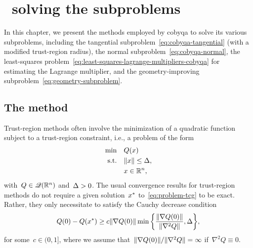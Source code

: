 %
%
%
\chapter{ \textemdash\ solving the subproblems}
\label{ch:cobyqa-subproblems}

In this chapter, we present the methods employed by \gls{cobyqa} to solve its various subproblems, including the tangential subproblem~\cref{eq:cobyqa-tangential} (with a modified trust-region radius), the normal subproblem~\cref{eq:cobyqa-normal}, the least-squares problem~\cref{eq:least-squares-lagrange-multipliers-cobyqa} for estimating the Lagrange multiplier, and the geometry-improving subproblem~\cref{eq:geometry-subproblem}.

\section{The  method}

Trust-region methods often involve the minimization of a quadratic function subject to a trust-region constraint, i.e., a problem of the form
\begin{subequations}
    \label{eq:problem-tcg}
    \begin{align}
        \min        & \quad Q(\iter)\\
        \text{s.t.} & \quad \norm{\iter} \le \rad,\\
                    & \quad \iter \in \R^n, \nonumber
    \end{align}
\end{subequations}
with~$Q \in \mathscr{Q}(\mathbb{R}^n)$ and~$\rad > 0$.
The usual convergence results for trust-region methods do not require a given solution~$\iter[\ast]$ to~\cref{eq:problem-tcg} to be exact.
Rather, they only necessitate to satisfy the Cauchy decrease condition
\begin{equation*}
    Q(0) - Q(\iter[\ast]) \ge c \norm{\nabla Q(0)} \min \set[\bigg]{\frac{\norm{\nabla Q(0)}}{\norm{\nabla^2 Q}}, \rad},
\end{equation*}
for some~$c \in (0, 1]$, where we assume that~$\lVert\nabla Q(0)\rVert / \lVert\nabla^2 Q\rVert = \infty$ if~$\nabla^2 Q \equiv 0$.

